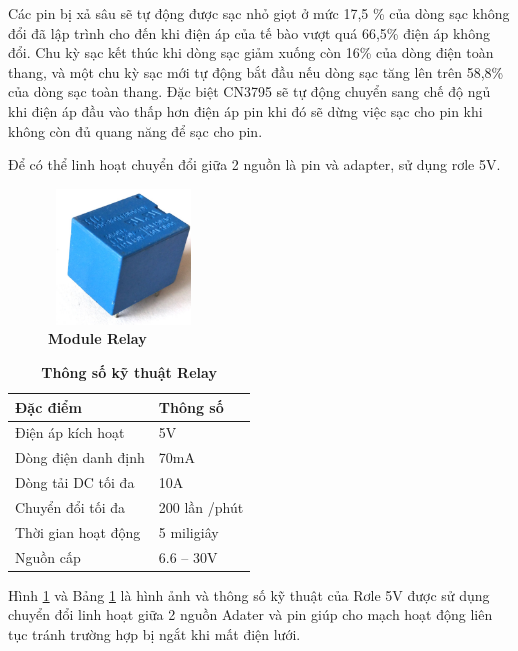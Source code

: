 \documentclass{article} %
\begin{document}
\begin{itemize}
		Các pin bị xả sâu sẽ tự động được sạc nhỏ giọt ở mức 17,5 \% của dòng sạc không đổi đã lập trình cho đến khi điện áp của tế bào vượt quá 66,5\% điện áp không đổi. Chu kỳ sạc kết thúc khi dòng sạc giảm xuống còn 16\% của dòng điện toàn thang, và một chu kỳ sạc mới tự động bắt đầu nếu dòng sạc tăng lên trên 58,8\% của dòng sạc toàn thang. Đặc biệt CN3795 sẽ tự động chuyển sang chế độ ngủ khi điện áp đầu vào thấp hơn điện áp pin khi đó sẽ dừng việc sạc cho pin khi không còn đủ quang năng để sạc cho pin. 
		
		Để có thể linh hoạt chuyển đổi giữa 2 nguồn là pin và adapter, sử dụng rơle 5V.
		
		\begin{figure}[!ht]
			\centering
			\includegraphics[width=4cm,height=3.6cm]{Images/Relay.png}
			\caption[Module Relay\cite{relay}]{\bfseries \fontsize{12pt}{0pt}\selectfont Module Relay\cite{relay}}
			\label{Relay}
		\end{figure}
		
		\begin{table}[H]
			\centering
			\begin{tabular}{|l|l|}
				\hline
				Đặc điểm            & Thông số      \\ \hline
				Điện áp kích hoạt   & 5V            \\ \hline
				Dòng điện danh định & 70mA          \\ \hline
				Dòng tải DC tối đa  & 10A           \\ \hline
				Chuyển đổi tối đa   & 200 lần /phút \\ \hline
				Thời gian hoạt động & 5 miligiây    \\ \hline
				Nguồn cấp           & 6.6 – 30V     \\ \hline
			\end{tabular}
			\caption[Thông số kỹ thuật Relay\cite{relay}]{\bfseries\fontsize{12pt}{0pt}\selectfont Thông số kỹ thuật Relay\cite{relay}}
			\label{TsRelay}
		\end{table}
		
		Hình \ref{Relay} và Bảng \ref{TsRelay} là hình ảnh và thông số kỹ thuật của Rơle 5V được sử dụng chuyển đổi linh hoạt giữa 2 nguồn Adater và pin giúp cho mạch hoạt động liên tục tránh trường hợp bị ngắt khi mất điện lưới.
		

\end{itemize}
\end{document}
